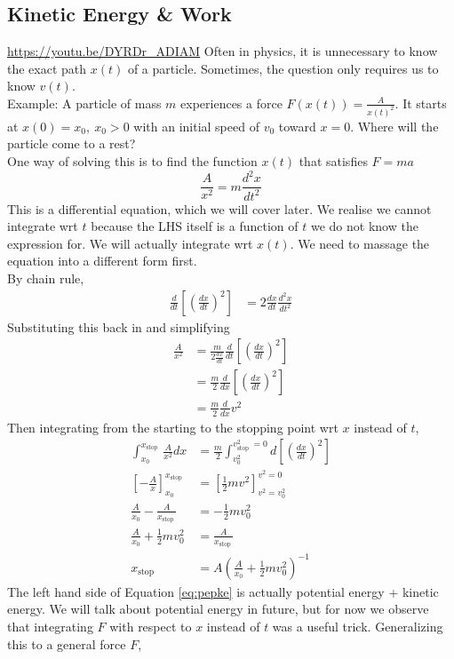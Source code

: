 \documentclass{article}
\begin{document}
\subsection{Kinetic Energy \& Work}
\url{https://youtu.be/DYRDr_ADIAM}
Often in physics, it is unnecessary to know the exact path $x(t)$ of a particle. Sometimes, the question only requires us to know $v(t)$. \\[10pt]
Example: A particle of mass $m$ experiences a force $F(x(t)) = \frac{A}{x(t)^2}$. It starts at $x(0)=x_0,\ x_0 > 0$ with an initial speed of $v_0$ toward $x=0$. Where will the particle come to a rest? \\[10pt]
One way of solving this is to find the function $x(t)$ that satisfies $F=ma$
$$\frac{A}{x^2} = m \frac{d^2x}{dt^2}$$
This is a differential equation, which we will cover later. We realise we cannot integrate wrt $t$ because the LHS itself is a function of $t$ we do not know the expression for. We will actually integrate wrt $x(t)$. We need to massage the equation into a different form first.\\[10pt]
By chain rule,
\begin{align}
\frac{d}{d t}\left[\left(\frac{d x}{d t}\right)^2\right]&=2  \frac{d x}{d t} \frac{d^2 x}{d t^2} 
\end{align}
Substituting this back in and simplifying
\begin{align}
\frac{A}{x^2}&=\frac{m}{2 \frac{d x}{d t}} \frac{d}{d t}\left[\left(\frac{d x}{d t}\right)^2\right] \\
& =\frac{m}{2} \frac{d}{d x}\left[\left(\frac{d x}{d t}\right)^2\right] \\
& =\frac{m}{2} \frac{d}{d x} v^2 
\end{align}
Then integrating from the starting to the stopping point wrt $x$ instead of $t$,
\begin{align} 
\int_{x_0}^{x_{\text {stop }}} \frac{A}{x^2} d x&=\frac{m}{2} \int_{v_0^2}^{v_{\text {stop }}^2=0} d\left[\left(\frac{d x}{d t}\right)^2\right] \\
\left[-\frac{A}{x}\right]_{x_0}^{x_\text{stop}} &= \left[\frac{1}{2} m v^2\right]_{v^2=v_0^2}^{v^2=0} \\
\frac{A}{x_0}-\frac{A}{x_\text {stop }}&=-\frac{1}{2} m v_0^2 \\
\frac{A}{x_0}+\frac{1}{2} m v_0^2&=\frac{A}{x_\text {stop }} \label{eq:pepke}\\
x_{\text{stop}} &= A \left(\frac{A}{x_0}+\frac{1}{2} m v_0^2\right)^{-1}
\end{align}
The left hand side of Equation \ref{eq:pepke} is actually potential energy + kinetic energy. We will talk about potential energy in future, but for now we observe that integrating $F$ with respect to $x$ instead of $t$ was a useful trick. Generalizing this to a general force $F$,
\end{document}
